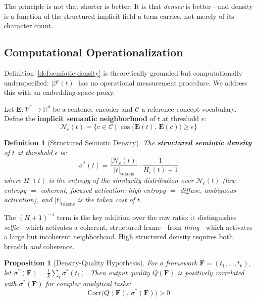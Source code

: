 \documentclass[12pt,a4paper]{article}
\newtheorem{definition}{Definition}[section]
\newtheorem{proposition}{Proposition}[section]
\begin{document}
The principle is not that shorter is better.
It is that \textit{denser} is better---and density is a function of the structured implicit field a term carries, not merely of its character count.

\subsection{Computational Operationalization}
\label{subsec:computation}

Definition~\ref{def:semiotic-density} is theoretically grounded but computationally underspecified: $|\mathcal{F}(t)|$ has no operational measurement procedure.
We address this with an embedding-space proxy.

Let $\mathbf{E}: \mathcal{V}^* \rightarrow \mathbb{R}^d$ be a sentence encoder and $\mathcal{C}$ a reference concept vocabulary.
Define the \textbf{implicit semantic neighborhood} of $t$ at threshold $\epsilon$:
\[
  \mathcal{N}_\epsilon(t) = \bigl\{
    c \in \mathcal{C} \;\big|\;
    \cos\bigl(\mathbf{E}(t),\, \mathbf{E}(c)\bigr) \geq \epsilon
  \bigr\}
\]

\begin{definition}[Structured Semiotic Density]
\label{def:sigma-structured}
The \textbf{structured semiotic density} of $t$ at threshold $\epsilon$ is:
\[
  \sigma^*(t) = \frac{|\mathcal{N}_\epsilon(t)|}{|t|_{\mathrm{tokens}}}
               \cdot \frac{1}{H_\epsilon(t) + 1}
\]
where $H_\epsilon(t)$ is the entropy of the similarity distribution over $\mathcal{N}_\epsilon(t)$
(low entropy $=$ coherent, focused activation; high entropy $=$ diffuse, ambiguous activation),
and $|t|_{\mathrm{tokens}}$ is the token cost of $t$.
\end{definition}

The $(H+1)^{-1}$ term is the key addition over the raw ratio: it distinguishes \textit{selfie}---which activates a coherent, structured frame---from \textit{thing}---which activates a large but incoherent neighborhood.
High structured density requires both breadth \textit{and} coherence.

\begin{proposition}[Density-Quality Hypothesis]
\label{prop:dq}
For a framework $\mathbf{F} = (t_1, \ldots, t_k)$, let $\bar{\sigma}^*(\mathbf{F}) = \frac{1}{k}\sum_i \sigma^*(t_i)$.
Then output quality $Q(\mathbf{F})$ is positively correlated with $\bar{\sigma}^*(\mathbf{F})$ for complex analytical tasks:
\[
  \mathrm{Corr}\bigl(Q(\mathbf{F}),\, \bar{\sigma}^*(\mathbf{F})\bigr) > 0
\]
\end{proposition}
\end{document}
